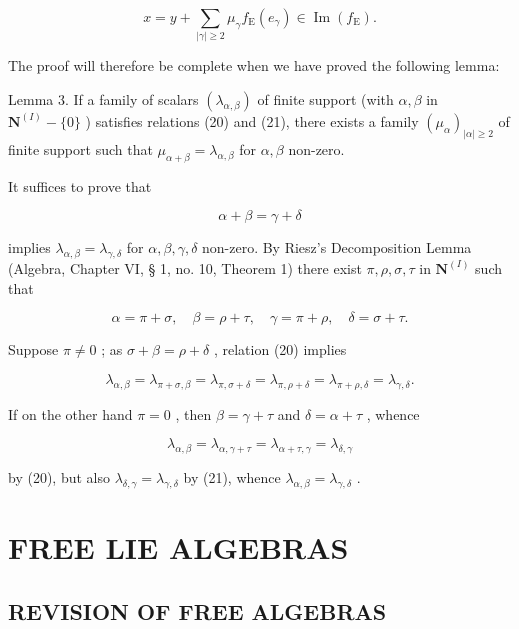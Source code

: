 \[
x = y + \sum_ {| \gamma | \geqslant 2} \mu_ {\gamma} f _ {\mathrm{E}} (e _ {\gamma}) \in \operatorname{Im} (f _ {\mathrm{E}}).
\]

The proof will therefore be complete when we have proved the following lemma:

Lemma 3. If a family of scalars \((\lambda_{\alpha, \beta})\) of finite support (with \(\alpha, \beta\) in \(\mathbf{N}^{(I)} - \{0\}\) ) satisfies relations (20) and (21), there exists a family \((\mu_{\alpha})_{|\alpha| \geqslant 2}\) of finite support such that \(\mu_{\alpha + \beta} = \lambda_{\alpha, \beta}\) for \(\alpha, \beta\) non-zero.

It suffices to prove that

\[
\alpha + \beta = \gamma + \delta\tag{23}
\]

implies \(\lambda_{\alpha, \beta} = \lambda_{\gamma, \delta}\) for \(\alpha, \beta, \gamma, \delta\) non-zero. By Riesz's Decomposition Lemma (Algebra, Chapter VI, § 1, no. 10, Theorem 1) there exist \(\pi, \rho, \sigma, \tau\) in \(\mathbf{N}^{(I)}\) such that

\[
\alpha = \pi + \sigma , \quad \beta = \rho + \tau , \quad \gamma = \pi + \rho , \quad \delta = \sigma + \tau .
\]

Suppose \(\pi \neq 0\) ; as \(\sigma + \beta = \rho + \delta\) , relation (20) implies

\[
\lambda_ {\alpha , \beta} = \lambda_ {\pi + \sigma , \beta} = \lambda_ {\pi , \sigma + \delta} = \lambda_ {\pi , \rho + \delta} = \lambda_ {\pi + \rho , \delta} = \lambda_ {\gamma , \delta}.
\]

If on the other hand \(\pi = 0\) , then \(\beta = \gamma + \tau\) and \(\delta = \alpha + \tau\) , whence

\[
\lambda_ {\alpha , \beta} = \lambda_ {\alpha , \gamma + \tau} = \lambda_ {\alpha + \tau , \gamma} = \lambda_ {\delta , \gamma}
\]

by (20), but also \(\lambda_{\delta, \gamma} = \lambda_{\gamma, \delta}\) by (21), whence \(\lambda_{\alpha, \beta} = \lambda_{\gamma, \delta}\) .

\section{FREE LIE ALGEBRAS}

\subsection{REVISION OF FREE ALGEBRAS}

